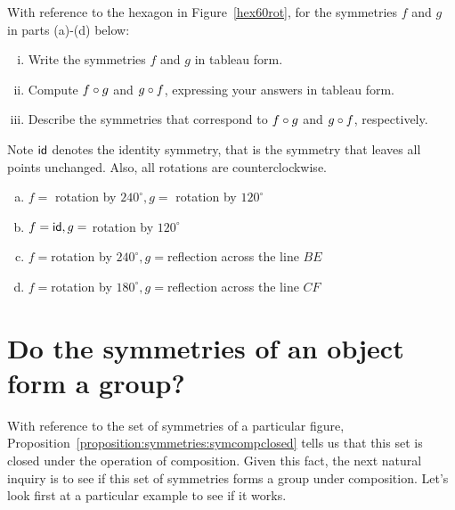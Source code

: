 \begin{exercise}{16}
With reference to the hexagon in Figure~\ref{hex60rot}, for the symmetries $f$ and $g$ in parts (a)-(d) below:
\begin{enumerate}[(i)]
\item
Write the symmetries $f$ and $g$ in tableau form.
\item
Compute $f \circ g$ and $g \circ f$, expressing your answers in tableau form.
\item 
Describe the symmetries that correspond to $f \circ g$ and $g \circ f$, respectively.
\end{enumerate}
\medskip

\noindent
Note ${\sf{i}d}$ denotes the identity symmetry, that is the symmetry that leaves all points unchanged. Also, all rotations are counterclockwise.
\medskip

\begin{enumerate}[(a)]
\item
$f=$ rotation by $240^\circ, g=$ rotation by $120^\circ$
\item
$f={\sf{i}d}, g=$ rotation by $120^\circ$
\item
$f=$rotation by $ 240^\circ, g=$reflection across the line $BE$
\item 
$f=$rotation by $ 180^\circ, g=$reflection across the line $CF$
\end{enumerate}
\end{exercise}

\section{Do the symmetries of an object form a group?\quad
{}}\label{SymmetryGroup}

With reference to the set of symmetries of a particular figure,  Proposition~\ref{proposition:symmetries:symcompclosed} tells us that this set is closed under the operation of composition. Given this fact, the next natural inquiry is to see if this set of symmetries forms a group under composition.  Let's look first at a particular example to see if it works.

